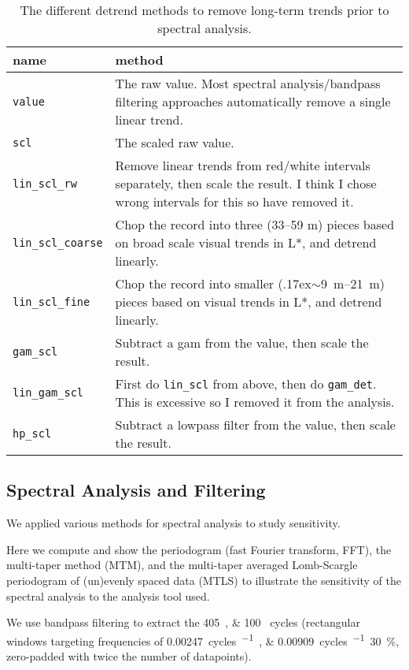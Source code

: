 \documentclass[draft]{agujournal2019}
\newcommand{\appr}{\raise.17ex\hbox{$\scriptstyle\sim$}} %
\begin{document}
\begin{table}[htbp]
\caption{\label{tab:detrend_types}The different detrend methods to remove long-term trends prior to spectral analysis.}
\centering
\begin{tabular}{ll}
  name & method\\
  \hline
  \texttt{value} & The raw value. Most spectral analysis/bandpass filtering
                   approaches automatically remove a single linear trend.\\
  \texttt{scl} & The scaled raw value.\\
  \texttt{lin\_scl\_rw} & Remove linear trends from red/white intervals separately, then scale the result. I think I chose wrong intervals for this so have removed it.\\
  \texttt{lin\_scl\_coarse} & Chop the record into three (33--59 m) pieces based on broad scale visual trends in \gls{L*}, and detrend linearly.\\
  \texttt{lin\_scl\_fine} & Chop the record into smaller (\appr\qtyrange{9}{21}{\metre}) pieces based on visual trends in \gls{L*}, and detrend linearly.\\
  \texttt{gam\_scl} & Subtract a gam from the value, then scale the result.\\
  \texttt{lin\_gam\_scl} & First do \texttt{lin\_scl} from above, then do \texttt{gam\_det}. This is excessive so I removed it from the analysis.\\
  \texttt{hp\_scl} & Subtract a lowpass filter from the value, then scale the result.\\
\end{tabular}
\end{table}

\subsection{Spectral Analysis and Filtering}\label{sec:spectral}

We applied various methods for spectral analysis to study sensitivity.

Here we compute and show the
periodogram (fast Fourier transform, FFT),
the multi-taper method (MTM),
and
the multi-taper averaged Lomb-Scargle periodogram of (un)evenly spaced data
(MTLS)
to illustrate the sensitivity of the spectral analysis to the analysis tool used.

We use bandpass filtering to extract the \qtylist{405;100}{\kiloyear} cycles
(rectangular windows targeting frequencies of
\qtylist{0.00247;0.00909}{cycles\per\kilo\year}\textpm\qty{30}{\percent}, zero-padded
with twice the number of datapoints).
\end{document}
